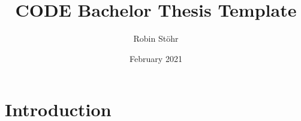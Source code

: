 \documentclass{article}
\title{CODE Bachelor Thesis Template}
\author{Robin Stöhr}
\date{February 2021}
\begin{document}
\maketitle

\section{Introduction}
\end{document}
